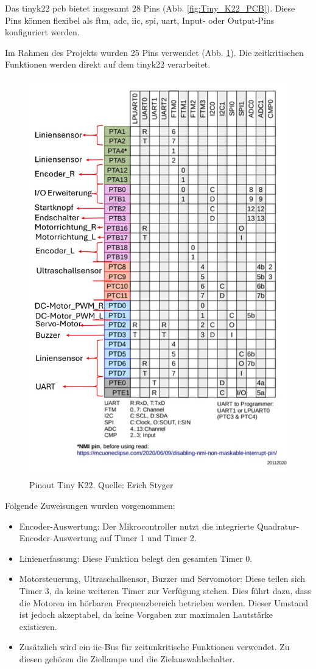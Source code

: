 Das \gls{tinyk22} \acrshort{pcb} bietet insgesamt 28 Pins (Abb. \ref{fig:Tiny_K22_PCB}). Diese Pins können flexibel als \acrfull{ftm}, \acrfull{adc}, \acrfull{iic}, \acrfull{spi}, \acrshort{uart}, Input- oder Output-Pins konfiguriert werden.

Im Rahmen des Projekts wurden 25 Pins verwendet (Abb. \ref{fig:Tiny_K22_Pinout_definition}). Die zeitkritischen Funktionen werden direkt auf dem \gls{tinyk22} verarbeitet.

\begin{figure}[H]
    \centering
    \includegraphics[width=0.8\linewidth, angle=-90]{img/Tiny_K22_Pinout_definition.jpg}
    \caption{Pinout Tiny K22. Quelle: Erich Styger\cite{tiny-K22-Pinout}}
    \label{fig:Tiny_K22_Pinout_definition}
\end{figure}

Folgende Zuweisungen wurden vorgenommen:
\begin{itemize}
    \item Encoder-Auswertung: Der Mikrocontroller nutzt die integrierte Quadratur-Encoder-Auswertung auf Timer 1 und Timer 2.
    \item Linienerfassung: Diese Funktion belegt den gesamten Timer 0.
    \item Motorsteuerung, Ultraschallsensor, Buzzer und Servomotor: Diese teilen sich Timer 3, da keine weiteren Timer zur Verfügung stehen. Dies führt dazu, dass die Motoren im hörbaren Frequenzbereich betrieben werden. Dieser Umstand ist jedoch akzeptabel, da keine Vorgaben zur maximalen Lautstärke existieren.
    \item Zusätzlich wird ein \acrshort{iic}-Bus für zeitunkritische Funktionen verwendet. Zu diesen gehören die Ziellampe und die Zielauswahlschalter.
\end{itemize}

